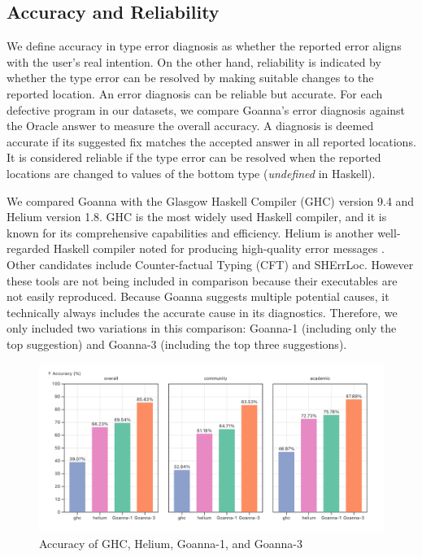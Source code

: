 \documentclass[pdflatex,lineno,sn-nature,Numbered]{sn-jnl}%
\begin{document}
\subsection{Accuracy and Reliability} \label{sub:eval-accuracy}

We define accuracy in type error diagnosis as whether the reported error aligns with the user's real intention. On the other hand, reliability is indicated by whether the type error can be resolved by making suitable changes to the reported location. An error diagnosis can be reliable but accurate. For each defective program in our datasets, we compare Goanna's error diagnosis against the Oracle answer to measure the overall accuracy. A diagnosis is deemed accurate if its suggested fix matches the accepted answer in all reported locations. It is considered reliable if the type error can be resolved when the reported locations are changed to values of the bottom type (\textit{undefined} in Haskell).

We compared Goanna with the Glasgow Haskell Compiler (GHC) version 9.4 \cite{Gamari_undated-zu} and Helium \cite{Hage2023-kk} version 1.8. GHC is the most widely used Haskell compiler, and it is known for its comprehensive capabilities and efficiency. Helium is another well-regarded Haskell compiler noted for producing high-quality error messages \cite{Heeren2003-kd}. Other candidates include Counter-factual Typing (CFT) \cite{Chen2014-dz,Chen2020-ad,Chen2022-xb} and SHErrLoc. However these tools are not being included in comparison because their executables are not easily reproduced. Because Goanna suggests multiple potential causes, it technically always includes the accurate cause in its diagnostics. Therefore, we only included two variations in this comparison: Goanna-1 (including only the top suggestion) and Goanna-3 (including the top three suggestions).

    \begin{figure}
        \centering
        \includegraphics[width=\linewidth]{images/accuracy.png}
        \caption{Accuracy of GHC, Helium, Goanna-1, and Goanna-3} 
        \label{fig:accuracy}
    \end{figure}
\end{document}
